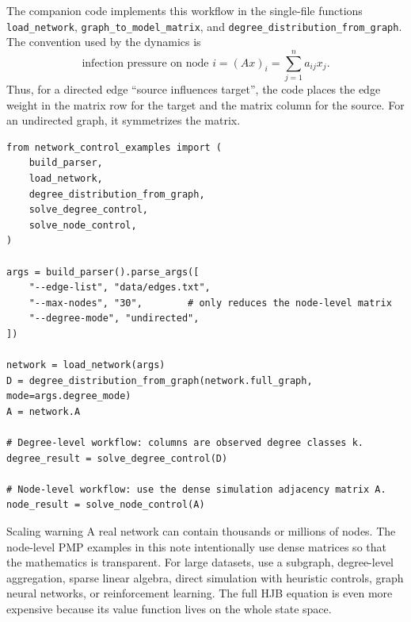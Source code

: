 \documentclass[11pt,a4paper]{article}
\begin{document}
The companion code implements this workflow in the single-file functions \texttt{load\_network}, \texttt{graph\_to\_model\_matrix}, and \texttt{degree\_distribution\_from\_graph}. The convention used by the dynamics is
\begin{equation}
  \text{infection pressure on node } i=(Ax)_i=\sum_{j=1}^n a_{ij}x_j.
\end{equation}
Thus, for a directed edge ``source influences target'', the code places the edge weight in the matrix row for the target and the matrix column for the source. For an undirected graph, it symmetrizes the matrix.


\begin{lstlisting}[caption={Minimal example: load an edge-list dataset, compute the degree distribution, and run degree-level and node-level models.}]
from network_control_examples import (
    build_parser,
    load_network,
    degree_distribution_from_graph,
    solve_degree_control,
    solve_node_control,
)

args = build_parser().parse_args([
    "--edge-list", "data/edges.txt",
    "--max-nodes", "30",        # only reduces the node-level matrix
    "--degree-mode", "undirected",
])

network = load_network(args)
D = degree_distribution_from_graph(network.full_graph, mode=args.degree_mode)
A = network.A

# Degree-level workflow: columns are observed degree classes k.
degree_result = solve_degree_control(D)

# Node-level workflow: use the dense simulation adjacency matrix A.
node_result = solve_node_control(A)
\end{lstlisting}

\begin{cautionbox}{Scaling warning}
A real network can contain thousands or millions of nodes. The node-level PMP examples in this note intentionally use dense matrices so that the mathematics is transparent. For large datasets, use a subgraph, degree-level aggregation, sparse linear algebra, direct simulation with heuristic controls, graph neural networks, or reinforcement learning. The full HJB equation is even more expensive because its value function lives on the whole state space.
\end{cautionbox}
\end{document}
